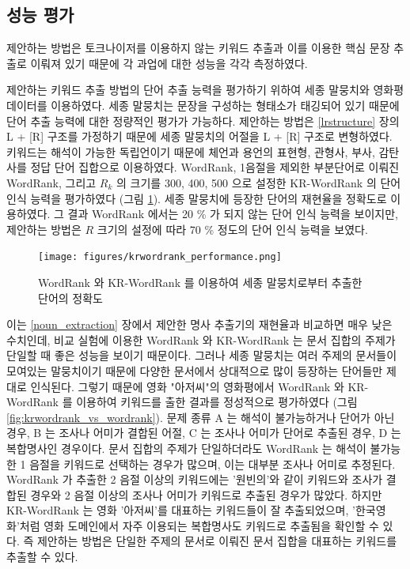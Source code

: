 \documentclass[11pt]{article}
\begin{document}
\subsection{성능 평가}

제안하는 방법은 토크나이저를 이용하지 않는 키워드 추출과 이를 이용한 핵심 문장 추출로 이뤄져 있기 때문에 각 과업에 대한 성능을 각각 측정하였다.

제안하는 키워드 추출 방법의 단어 추출 능력을 평가하기 위하여 세종 말뭉치와 영화평 데이터를 이용하였다.
세종 말뭉치는 문장을 구성하는 형태소가 태깅되어 있기 때문에 단어 추출 능력에 대한 정량적인 평가가 가능하다.
제안하는 방법은 \ref{lrstructure} 장의 L + [R] 구조를 가정하기 때문에 세종 말뭉치의 어절을 L + [R] 구조로 변형하였다.
키워드는 해석이 가능한 독립언이기 때문에 체언과 용언의 표현형, 관형사, 부사, 감탄사를 정답 단어 집합으로 이용하였다.
WordRank, 1음절을 제외한 부분단어로 이뤄진 WordRank, 그리고 $R_k$ 의 크기를 300, 400, 500 으로 설정한 KR-WordRank 의 단어 인식 능력을 평가하였다 (그림 \ref{fig:krwordrank_performance}).
세종 말뭉치에 등장한 단어의 재현율을 정확도로 이용하였다.
그 결과 WordRank 에서는 20 \% 가 되지 않는 단어 인식 능력을 보이지만, 제안하는 방법은 $R$ 크기의 설정에 따라 70 \% 정도의 단어 인식 능력을 보였다.

\begin{figure}[H]
\centering
\label{fig:krwordrank_performance}
\texttt{[image: figures/krwordrank\_performance.png]}
\caption{WordRank 와 KR-WordRank 를 이용하여 세종 말뭉치로부터 추출한 단어의 정확도}
\end{figure}

이는 \ref{noun_extraction} 장에서 제안한 명사 추출기의 재현율과 비교하면 매우 낮은 수치인데, 비교 실험에 이용한 WordRank 와 KR-WordRank 는 문서 집합의 주제가 단일할 때 좋은 성능을 보이기 때문이다.
그러나 세종 말뭉치는 여러 주제의 문서들이 모여있는 말뭉치이기 때문에 다양한 문서에서 상대적으로 많이 등장하는 단어들만 제대로 인식된다.
그렇기 때문에 영화 "아저씨"의 영화평에서 WordRank 와 KR-WordRank 를 이용하여 키워드를 출한 결과를 정성적으로 평가하였다 (그림 \ref{fig:krwordrank_vs_wordrank}).
문제 종류 A 는 해석이 불가능하거나 단어가 아닌 경우, B 는 조사나 어미가 결합된 어절, C 는 조사나 어미가 단어로 추출된 경우, D 는 복합명사인 경우이다.
문서 집합의 주제가 단일하더라도 WordRank 는 해석이 불가능한 1 음절을 키워드로 선택하는 경우가 많으며, 이는 대부분 조사나 어미로 추정된다.
WordRank 가 추출한 2 음절 이상의 키워드에는 '원빈의'와 같이 키워드와 조사가 결합된 경우와 2 음절 이상의 조사나 어미가 키워드로 추출된 경우가 많았다.
하지만 KR-WordRank 는 영화 '아저씨'를 대표하는 키워드들이 잘 추출되었으며, '한국영화'처럼 영화 도메인에서 자주 이용되는 복합명사도 키워드로 추출됨을 확인할 수 있다.
즉 제안하는 방법은 단일한 주제의 문서로 이뤄진 문서 집합을 대표하는 키워드를 추출할 수 있다.
\end{document}

